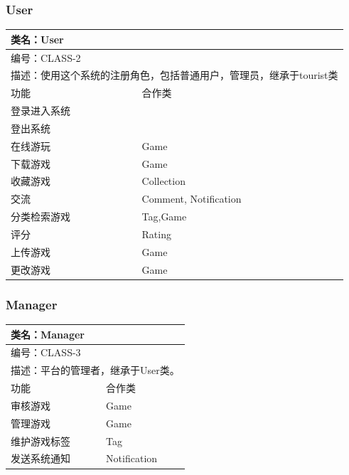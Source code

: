 \documentclass[12pt]{ctexart} %
\begin{document}
\subsubsection{User}
\begin{tabular}{|l|l|}
  \hline
  \multicolumn{2}{|l|}{类名：User} \\
  \hline
  \multicolumn{2}{|l|}{编号：CLASS-2} \\
  \hline
  \multicolumn{2}{|l|}{描述：使用这个系统的注册角色，包括普通用户，管理员，继承于tourist类} \\
  \hline
  功能 & 合作类 \\
  \hline
  登录进入系统 & \\
  \hline
  登出系统 & \\
  \hline
  在线游玩 & Game \\
  \hline
  下载游戏 & Game \\
  \hline
  收藏游戏 & Collection \\
  \hline
  交流 & Comment, Notification \\
  \hline
  分类检索游戏 & Tag,Game \\
  \hline
  评分 & Rating \\
  \hline
  上传游戏 & Game\\
  \hline
  更改游戏 & Game\\
  \hline
  \end{tabular}

\subsubsection{Manager}
\begin{tabular}{|l|l|}
  \hline
  \multicolumn{2}{|l|}{类名：Manager} \\
  \hline
  \multicolumn{2}{|l|}{编号：CLASS-3} \\
  \hline
  \multicolumn{2}{|l|}{描述：平台的管理者，继承于User类。} \\
  \hline
  功能 & 合作类 \\
  \hline
  审核游戏 & Game\\
  \hline
  管理游戏 & Game\\
  \hline
  维护游戏标签 & Tag\\
  \hline
  发送系统通知 & Notification\\
  \hline
  \end{tabular}
\end{document}
